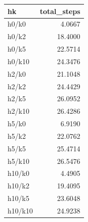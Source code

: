 \begin{tabular}{lr}
\toprule
hk & total_steps \\
\midrule
h0/k0 & 4.0667 \\
h0/k2 & 18.4000 \\
h0/k5 & 22.5714 \\
h0/k10 & 24.3476 \\
h2/k0 & 21.1048 \\
h2/k2 & 24.4429 \\
h2/k5 & 26.0952 \\
h2/k10 & 26.4286 \\
h5/k0 & 6.9190 \\
h5/k2 & 22.0762 \\
h5/k5 & 25.4714 \\
h5/k10 & 26.5476 \\
h10/k0 & 4.4905 \\
h10/k2 & 19.4095 \\
h10/k5 & 23.6048 \\
h10/k10 & 24.9238 \\
\bottomrule
\end{tabular}
